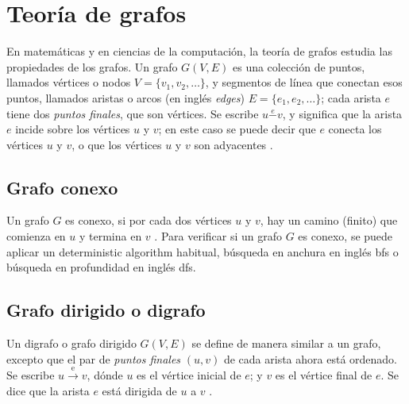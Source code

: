 

\section{Teoría de grafos}\label{graph theory}
En matemáticas y en ciencias de la computación, la teoría de grafos estudia las propiedades de los grafos. Un grafo \( G(V,E) \) es una colección de puntos, llamados vértices o nodos \( V = \{ v_1, v_2, \dots \} \), y segmentos de línea que conectan esos puntos, llamados aristas o arcos (en inglés \textit{edges}) \( E = \{ e_1, e_2, \dots \} \); cada arista \( e \) tiene dos \textit{puntos finales}, que son vértices. Se escribe \( u \overset{e}{-} v \), y significa que la arista \( e \) incide sobre los vértices \( u \) y \( v \); en este caso se puede decir que \( e \) conecta los vértices \( u \) y \( v \), o que los vértices \( u \) y \( v \) son adyacentes \cite{even2011graph}.

\subsection{Grafo conexo}
Un grafo \( G \) es conexo, si por cada dos vértices \( u \) y \( v \), hay un camino (finito) que comienza en \( u \) y termina en \( v \) \cite{even2011graph}. Para verificar si un grafo \( G \) es conexo, se puede aplicar un \gls{deterministic algorithm} habitual, búsqueda en anchura en inglés \acrfull{bfs} o búsqueda en profundidad en inglés \acrfull{dfs}.

\subsection{Grafo dirigido o digrafo}
Un digrafo o grafo dirigido \( G(V,E) \) se define de manera similar a un grafo, excepto que el par de \textit{puntos finales} \( (u, v) \) de cada arista ahora está ordenado. Se escribe \( u \xrightarrow{\text{e}} v \), dónde \( u \) es el vértice inicial de \( e \); y \( v \) es el vértice final de \( e \). Se dice que la arista \( e \) está dirigida de \( u \) a \( v \) \cite{even2011graph}.